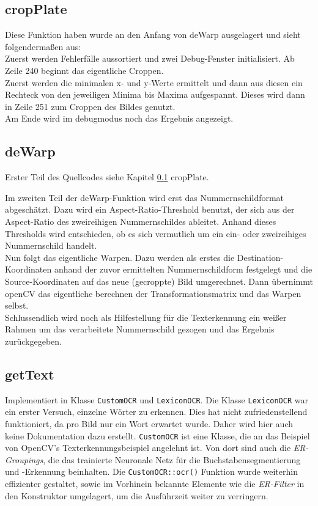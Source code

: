 \documentclass{../Vorlage/sebDenCls}
\begin{document}



\subsection{cropPlate}
\label{croppl}
Diese Funktion haben wurde an den Anfang von deWarp ausgelagert und sieht folgendermaßen aus:\\

Zuerst werden Fehlerfälle aussortiert und zwei Debug-Fenster initialisiert. Ab Zeile 240 beginnt das eigentliche Croppen. \\
Zuerst werden die minimalen x- und y-Werte ermittelt und dann aus diesen ein Rechteck von den jeweiligen Minima bis Maxima aufgespannt. Dieses wird dann in Zeile 251 zum Croppen des Bildes genutzt.\\
Am Ende wird im debugmodus noch das Ergebnis angezeigt.
\subsection{deWarp}
\label{dewarp}
Erster Teil des Quellcodes siehe Kapitel \ref{croppl} cropPlate.

Im zweiten Teil der deWarp-Funktion wird erst das Nummernschildformat abgeschätzt. Dazu wird ein Aspect-Ratio-Threshold benutzt, der sich aus der Aspect-Ratio des zweireihigen Nummernschildes ableitet. Anhand dieses Thresholds wird entschieden, ob es sich vermutlich um ein ein- oder zweireihiges Nummernschild handelt.\\
Nun folgt das eigentliche Warpen. Dazu werden als erstes die Destination-Koordinaten anhand der zuvor ermittelten Nummernschildform festgelegt und die Source-Koordinaten auf das neue (gecroppte) Bild umgerechnet. Dann übernimmt openCV das eigentliche berechnen der Transformationsmatrix und das Warpen selbst.\\
Schlussendlich wird noch als Hilfestellung für die Texterkennung ein weißer Rahmen um das verarbeitete Nummernschild gezogen und das Ergebnis zurückgegeben.

\subsection{getText}
Implementiert in Klasse \texttt{CustomOCR} und \texttt{LexiconOCR}.
Die Klasse \texttt{LexiconOCR} war ein erster Versuch, einzelne Wörter zu erkennen. Dies hat nicht zufriedenstellend funktioniert, da pro Bild nur ein Wort erwartet wurde. Daher wird hier auch keine Dokumentation dazu erstellt.
\texttt{CustomOCR} ist eine Klasse, die an das Beispiel von OpenCV's Texterkennungsbeispiel angelehnt ist. Von dort sind auch die \textit{ER-Groupings}, die das trainierte Neuronale Netz für die Buchstabensegmentierung und -Erkennung beinhalten. Die \texttt{CustomOCR::ocr()} Funktion wurde weiterhin effizienter gestaltet, sowie im Vorhinein bekannte Elemente wie die \textit{ER-Filter} in den Konstruktor umgelagert, um die Ausführzeit weiter zu verringern.
\end{document}
